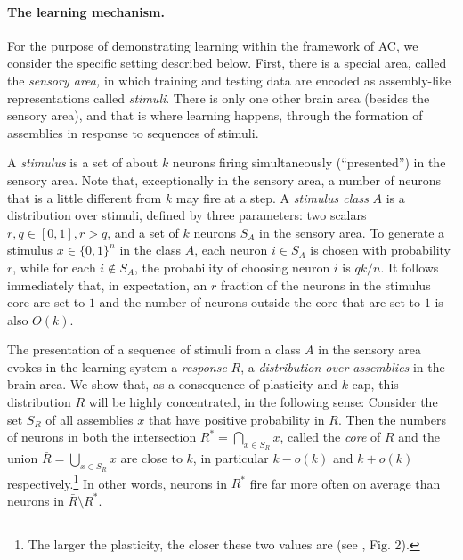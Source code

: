 \documentclass[final,12pt]{colt2022} %
\newcommand{\assmcore}[1]{{#1}^*}
\newcommand{\stimcore}[1]{S_{#1}}
\newcommand{\support}[1]{\bar{#1}}
\begin{document}
\paragraph{The learning mechanism.} 
For the purpose of demonstrating learning within the framework of AC, we consider the specific setting described below. First, there is a special area, called the {\em sensory area,} in which training and testing data are encoded as assembly-like representations called {\em stimuli}. There is only one other brain area (besides the sensory area), and that is where learning happens, through the formation of assemblies in response to sequences of stimuli.

A {\em stimulus} is a set of about $k$ neurons firing simultaneously (``presented'') in the sensory area. Note that, exceptionally in the sensory area, a number of neurons that is a little different from $k$ may fire at a step.  A {\em stimulus class} $A$ is a distribution over stimuli, defined by three parameters: two scalars $r,q \in [0,1], r > q$, and a set of $k$ neurons $\stimcore{A}$ in the sensory area.  To generate a stimulus $x \in \{0,1\}^n$ in the class $A$, each neuron $i \in \stimcore{A}$ is chosen with probability $r$, while for each $i \not\in \stimcore{A}$, the probability of choosing neuron $i$ is $qk/n$. It follows immediately that, in expectation, an $r$ fraction of the neurons in the stimulus core are set to $1$ and the number of neurons outside the core that are set to $1$ is also $O(k)$. 

The presentation of a sequence of stimuli from a class $A$ in the sensory area evokes in the learning system a {\em response} $R$, a {\em distribution over assemblies} in the brain area.  %
We show that, as a consequence of plasticity and $k$-cap, this distribution $R$ will be highly concentrated, in the following sense: Consider the set $S_R$ of all assemblies $x$ that have positive probability in $R$.  Then the numbers of neurons in both the intersection $\assmcore{R}=\bigcap_{x\in S_R} x$, called the {\em core} of $R$ and the union $\support{R}=\bigcup_{x\in S_R} x$ are close to $k$, in particular $k-o(k)$ and $k+o(k)$ respectively.\footnote{The larger the plasticity, the closer these two values are (see \citet{papadimitriou2019random}, Fig. 2).}  %
In other words, neurons in $\assmcore{R}$ fire far more often on average than neurons in $\support{R} \setminus \assmcore{R}$.
\end{document}

